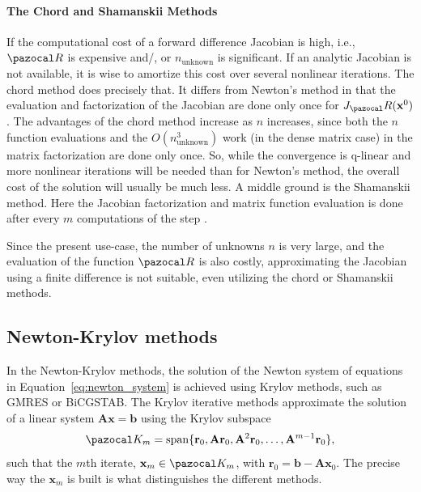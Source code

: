 \paragraph{The Chord and Shamanskii Methods}

If the computational cost of a forward difference Jacobian is high, i.e., \(\pazocal R\) is expensive and/, or \(n_\text{unknown}\) is significant. If an analytic Jacobian is not available, it is wise to amortize this cost over several nonlinear iterations.
The chord method does precisely that.
It differs from Newton's method in that the evaluation and factorization of the Jacobian are done only once for \(J_\pazocal R(\mathbf x^0)\).
The advantages of the chord method increase as \(n\) increases, since both the \(n\) function evaluations and the \(O(n_\text{unknown}^{3})\) work (in the dense matrix case) in the matrix factorization are done only once.
So, while the convergence is q-linear and more nonlinear iterations will be needed than for Newton's method, the overall cost of the solution will usually be much less.
A middle ground is the Shamanskii method.
Here the Jacobian factorization and matrix function evaluation is done after every \(m\) computations of the step \citep{kelley_solving_2003}.

Since the present use-case, the number of unknowns \(n\) is very large, and the evaluation of the function \(\pazocal R\) is also costly, approximating the Jacobian using a finite difference is not suitable, even utilizing the chord or Shamanskii methods.


\subsection{Newton-Krylov methods} \label{sec:newton_krylov}

In the Newton-Krylov methods, the solution of the Newton system of equations in Equation~\eqref{eq:newton_system} is achieved using Krylov methods, such as GMRES or BiCGSTAB.
The Krylov iterative methods approximate the solution of a linear system \(\mathbf A \mathbf x = \mathbf b\) using the Krylov subspace
\begin{equation}
  \pazocal K_m = \operatorname{span}\{\mathbf r_0, \mathbf A\mathbf r_0, \mathbf A^2 \mathbf r_0, \dots, \mathbf A^{m-1}\mathbf r_0\},
\end{equation}
such that the \(m\)th iterate, \(\mathbf x_m\in \pazocal K_m\), with \(\mathbf r_0 = \mathbf b - \mathbf A \mathbf x_0\).
The precise way the \(\mathbf x_m\) is built is what distinguishes the different methods.

